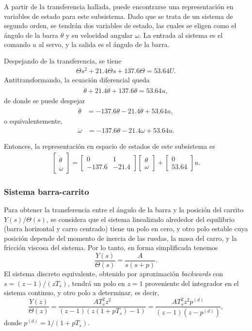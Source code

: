 A partir de la transferencia hallada, puede encontrarse una representación en variables de estado para este subsistema. Dado que se trata de un sistema de segundo orden, se tendrán dos variables de estado, las cuales se eligen como el ángulo de la barra $\theta$ y su velocidad angular $\omega$. La entrada al sistema es el comando $u$ al servo, y la salida es el ángulo de la barra.

Despejando de la transferencia, se tiene
\begin{align*}
    \Theta s^2 + 21.4 \Theta s + 137.6 \Theta = 53.64 U.
\end{align*}
Antitransformando, la ecuación diferencial queda
\begin{align*}
    \ddot{\theta} + 21.4 \dot{\theta} + 137.6 \theta = 53.64 u,
\end{align*}
de donde se puede despejar
\begin{align*}
    \ddot{\theta} &= -137.6 \theta - 21.4 \dot{\theta} + 53.64 u,
\end{align*}
o equivalentemente,
\begin{align*}
    \dot{\omega} &= -137.6 \theta - 21.4 \omega + 53.64 u.
\end{align*}

Entonces, la representación en espacio de estados de este subsistema es
\begin{align*}
    \begin{bmatrix} \dot{\theta} \\ \dot{\omega} \end{bmatrix} =
        \begin{bmatrix} 0 & 1 \\ -137.6 & -21.4 \end{bmatrix} \begin{bmatrix} \theta \\ \omega \end{bmatrix}
        + \begin{bmatrix} 0 \\ 53.64 \end{bmatrix} u.
\end{align*}

\subsubsection{Sistema barra-carrito}

Para obtener la transferencia entre el ángulo de la barra y la posición del carrito $Y(s) / \Theta(s)$, se considera que el sistema linealizado alrededor del equilibrio (barra horizontal y carro centrado) tiene un polo en cero, y otro polo estable cuya posición depende del momento de inercia de las ruedas, la masa del carro, y la fricción viscosa del sistema. Por lo tanto, en forma simplificada tenemos
\[
    \frac{Y(s)}{\Theta(s)} = \frac{A}{s(s+p)}.
\]
El sistema discreto equivalente, obtenido por aproximación \emph{backwards} con $s = (z-1)/(z T_s)$, tendrá un polo en $z = 1$ proveniente del integrador en el sistema continuo, y otro polo a determinar, es decir,
\[
    \frac{Y(z)}{\Theta(z)} = \frac{A T_s^2 z^2}{(z - 1)(z (1 + p T_s) - 1)} = \frac{A T_s^2 z^2 p^{(d)}}{(z-1)(z-p^{(d)})},
\]
donde $p^{(d)} = 1/(1 + p T_s)$.

